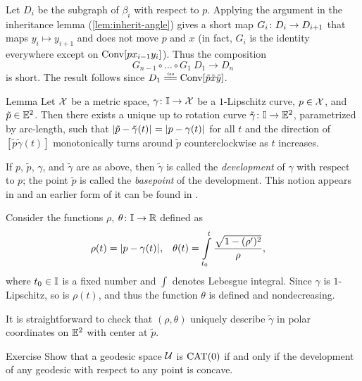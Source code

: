 Let $D_i$ be the subgraph of $\beta_i$ with respect to $p$.
Applying the argument in the inheritance lemma (\ref{lem:inherit-angle}) gives a short map $G_i\:D_{i}\z\to D_{i+1}$ that maps $y_{i}\mapsto y_{i+1}$ and does not move $p$ and $x$ (in fact,  $G_i$ is the identity everywhere except on $\mathop{\rm Conv}\nolimits[px_{i-1}y_i]$).
Thus the composition 
\[G_{n-1}\circ\ldots\circ G_1\: D_1\to D_n\]
is short.
The result follows since $D_1\iso\Conv\trig{\tilde p}{\tilde x}{\tilde y}$.
\qeds

\begin{thm}{Lemma}\label{lem:devel}\label{def:devel}
Let $\mathcal{X}$ be a metric space, 
$\gamma\colon\mathbb{I}\to \mathcal{X}$ be a $1$-Lipschitz curve,
$p\in \mathcal{X}$,
and $\tilde p\in\mathbb{E}^2$.
Then there exists a unique up to rotation curve
$\tilde \gamma\colon \mathbb{I}\to \mathbb{E}^2$, parametrized by arc-length, 
such that
$\dist{\tilde p}{\tilde \gamma(t)}{}\z=\dist{p}{\gamma(t)}{}$ for all $t$
and the direction of
$[\tilde p\tilde \gamma(t)]$ monotonically turns around $\tilde p$ counterclockwise as $t$ increases.
\end{thm}

If $p$, $\tilde p$, $\gamma$, and $\tilde \gamma$ are as above,
then $\tilde \gamma$ is called the \emph{development} of $\gamma$ with respect to $p$; 
the point $\tilde p$ is called the \emph{basepoint} of the development.
This notion appears in \cite{alexandrov-1957}
and an earlier form of it can be found in \cite{liberman}.

Consider the functions $\rho$, $\theta\colon\mathbb{I}\to\mathbb{R}$ defined as 
\begin{align*}
\rho(t)
&=\dist{p}{\gamma(t)}{},
&
\theta(t)
&=
\int\limits_{t_0}^{t}\frac{\sqrt{1-(\rho')^2}}{\rho},
\end{align*}
where $t_0\in\mathbb{I}$ is a fixed number and $\int$ denotes Lebesgue integral.
Since $\gamma$ is $1$-Lipschitz, so is $\rho(t)$, and thus the function $\theta$ is defined and nondecreasing.

It is straightforward to check that $(\rho,\theta)$ uniquely describe $\tilde \gamma$ in polar coordinates on $\mathbb{E}^2$ with center at $\tilde p$.
\qeds

\begin{thm}[!]{Exercise}\label{ex:devel-comp-CAT}
Show that a geodesic space $\mathcal{U}$ is $\mathrm{CAT}(0)$ if and only if the development of any geodesic with respect to any point is concave.
\end{thm}



